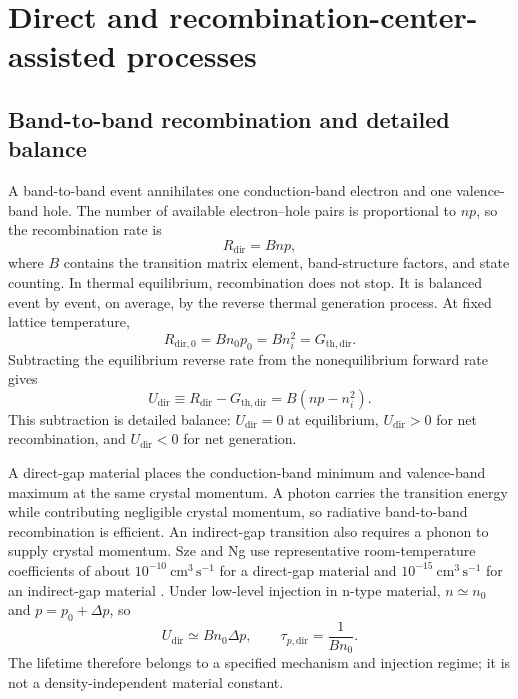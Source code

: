 \section{Direct and recombination-center-assisted processes}

\subsection{Band-to-band recombination and detailed balance}

A band-to-band event annihilates one conduction-band electron and one
valence-band hole.  The number of available electron--hole pairs is
proportional to $np$, so the recombination rate is
\begin{equation}
  R_{\mathrm{dir}}=Bnp,
  \label{eq:direct-recombination-rate}
\end{equation}
where $B$ contains the transition matrix element, band-structure factors, and
state counting.  In thermal equilibrium, recombination does not stop.  It is
balanced event by event, on average, by the reverse thermal generation process.
At fixed lattice temperature,
\begin{equation}
  R_{\mathrm{dir},0}=Bn_0p_0=Bn_i^2
  =G_{\mathrm{th,dir}}.
  \label{eq:direct-equilibrium-detailed-balance}
\end{equation}
Subtracting the equilibrium reverse rate from the nonequilibrium forward rate
gives
\begin{equation}
  \boxed{
  U_{\mathrm{dir}}
  \equiv R_{\mathrm{dir}}-G_{\mathrm{th,dir}}
  =B(np-n_i^2).
  }
  \label{eq:direct-net-recombination}
\end{equation}
This subtraction is detailed balance: $U_{\mathrm{dir}}=0$ at equilibrium,
$U_{\mathrm{dir}}>0$ for net recombination, and $U_{\mathrm{dir}}<0$ for net
generation.

A direct-gap material places the conduction-band minimum and valence-band
maximum at the same crystal momentum.  A photon carries the transition energy
while contributing negligible crystal momentum, so radiative band-to-band
recombination is efficient.  An indirect-gap transition also requires a phonon
to supply crystal momentum.  Sze and Ng use representative room-temperature
coefficients of about $10^{-10}\ \mathrm{cm^3\,s^{-1}}$ for a direct-gap
material and $10^{-15}\ \mathrm{cm^3\,s^{-1}}$ for an indirect-gap material
\cite[Sec.~1.5.4, Eqs.~(88)--(91)]{szeNg2007}.  Under low-level injection in
n-type material, $n\simeq n_0$ and $p=p_0+\Delta p$, so
\begin{equation}
  U_{\mathrm{dir}}\simeq Bn_0\Delta p,
  \qquad
  \tau_{p,\mathrm{dir}}=\frac{1}{Bn_0}.
  \label{eq:direct-low-injection-lifetime}
\end{equation}
The lifetime therefore belongs to a specified mechanism and injection regime;
it is not a density-independent material constant.

